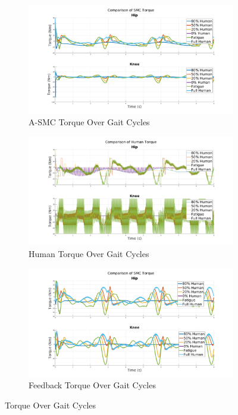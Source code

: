 \begin{figure}
    \centering
    \begin{subfigure}{0.8\linewidth}
        \centering
        \includegraphics[width=\columnwidth]{images/controllers/gait/SMC.png}
        \caption[A-SMC Torque Over Gait Cycles]{A-SMC Torque Over Gait Cycles}
        \label{fig:SMCTripleGaitMotion}
    \end{subfigure}
    \begin{subfigure}{0.8\linewidth}
        \centering
        \includegraphics[width=\columnwidth]{images/controllers/gait/human.png}
        \caption[Human Torque Over Gait Cycles]{Human Torque Over Gait Cycles}
        \label{fig:HumanTripleGaitMotion}
    \end{subfigure}
        \begin{subfigure}{0.8\linewidth}
        \centering
        \includegraphics[width=\columnwidth]{images/controllers/gait/feedback.png}
        \caption[Human Torque Over Gait Cycles]{Feedback Torque Over Gait Cycles}
        \label{fig:InteractionTripleGaitInteration}
    \end{subfigure}
    \caption{Torque Over Gait Cycles}
    \label{fig:TorqueOverGaitCycles}
\end{figure}
